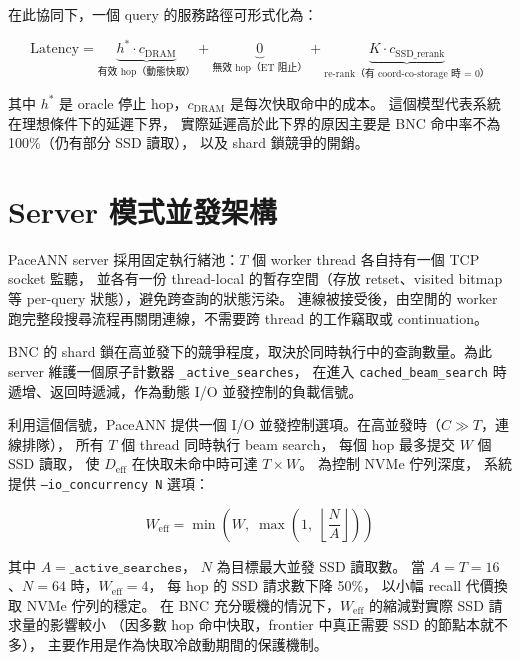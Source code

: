 在此協同下，一個 query 的服務路徑可形式化為：

\begin{equation}
  \text{Latency} = \underbrace{h^* \cdot c_\text{DRAM}}_{\text{有效 hop（動態快取）}}
                 + \underbrace{0}_{\text{無效 hop（ET 阻止）}}
                 + \underbrace{K \cdot c_\text{SSD\_rerank}}_{\text{re-rank（有 coord-co-storage 時 = 0）}}
  \label{eq:latency-model}
\end{equation}

其中 $h^*$ 是 oracle 停止 hop，$c_\text{DRAM}$ 是每次快取命中的成本。
這個模型代表系統在理想條件下的延遲下界，
實際延遲高於此下界的原因主要是 BNC 命中率不為 100\%（仍有部分 SSD 讀取），
以及 shard 鎖競爭的開銷。

\section{Server 模式並發架構}
\label{sec:server}

PaceANN server 採用固定執行緒池：$T$ 個 worker thread 各自持有一個 TCP socket 監聽，
並各有一份 thread-local 的暫存空間（存放 retset、visited bitmap 等 per-query 狀態），避免跨查詢的狀態污染。
連線被接受後，由空閒的 worker 跑完整段搜尋流程再關閉連線，不需要跨 thread 的工作竊取或 continuation。

BNC 的 shard 鎖在高並發下的競爭程度，取決於同時執行中的查詢數量。為此 server 維護一個原子計數器 \texttt{\_active\_searches}，
在進入 \texttt{cached\_beam\_search} 時遞增、返回時遞減，作為動態 I/O 並發控制的負載信號。

利用這個信號，PaceANN 提供一個 I/O 並發控制選項。在高並發時（$C \gg T$，連線排隊），
所有 $T$ 個 thread 同時執行 beam search，
每個 hop 最多提交 $W$ 個 SSD 讀取，
使 $D_\text{eff}$ 在快取未命中時可達 $T \times W$。
為控制 NVMe 佇列深度，
系統提供 \texttt{--io\_concurrency N} 選項：

\begin{equation}
  W_\text{eff} = \min\!\left(W,\; \max\!\left(1,\; \left\lfloor \frac{N}{A} \right\rfloor\right)\right)
  \label{eq:io-concurrency}
\end{equation}

其中 $A = \texttt{\_active\_searches}$，
$N$ 為目標最大並發 SSD 讀取數。
當 $A = T = 16$、$N = 64$ 時，$W_\text{eff} = 4$，
每 hop 的 SSD 請求數下降 50\%，
以小幅 recall 代價換取 NVMe 佇列的穩定。
在 BNC 充分暖機的情況下，$W_\text{eff}$ 的縮減對實際 SSD 請求量的影響較小
（因多數 hop 命中快取，frontier 中真正需要 SSD 的節點本就不多），
主要作用是作為快取冷啟動期間的保護機制。

